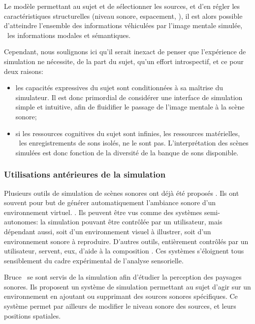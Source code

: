 Le modèle permettant au sujet et de sélectionner les sources, et d'en régler les caractéristiques structurelles (niveau sonore, espacement, \etc), il est alors possible d'atteindre l'ensemble des informations véhiculées par l'image mentale simulée, \ie~les informations modales et sémantiques.

Cependant, nous soulignons ici qu'il serait inexact de penser que l'expérience de simulation ne nécessite, de la part du sujet, qu'un effort introspectif, et ce pour deux raisons:

\begin{itemize}
\item les capacités expressives du sujet sont conditionnées à sa maîtrise du simulateur. Il est donc primordial de considérer une interface de simulation simple et intuitive, afin de fluidifier le passage de l'image mentale à la scène sonore;
\item si les ressources cognitives du sujet sont infinies, les ressources matérielles, \ie~les enregistrements de sons isolés, ne le sont pas. L'interprétation des scènes simulées est donc fonction de la diversité de la banque de sons disponible. 
\end{itemize}
 
\subsubsection{Utilisations antérieures de la simulation}

Plusieurs outils de simulation de scènes sonores ont déjà été proposés \citep{misra2006new,misra2007musical,valle2009framework,finney2010soundscape,schirosa2010system}. Ils ont souvent pour but de générer automatiquement l'ambiance sonore d'un environnement virtuel. \citep{valle2009framework,finney2010soundscape}. Ils peuvent être vus comme des systèmes semi-autonomes: la simulation pouvant être contrôlée par un utilisateur, mais dépendant aussi, soit d'un environnement visuel à illustrer, soit d'un environnement sonore à reproduire. D'autres outils, entièrement contrôlés par un utilisateur, servent, eux, d'aide à la composition \citep{misra2006new,misra2007musical}. Ces systèmes s'éloignent tous sensiblement du cadre expérimental de l'analyse sensorielle.

Bruce~\al \citep{bruce2009development,bruce2014effects} se sont servis de la simulation afin d'étudier la perception des paysages sonores. Ils proposent un système de simulation permettant au sujet d'agir sur un environnement en ajoutant ou supprimant des sources sonores spécifiques. Ce système permet par ailleurs de modifier le niveau sonore des sources, et leurs positions spatiales.

